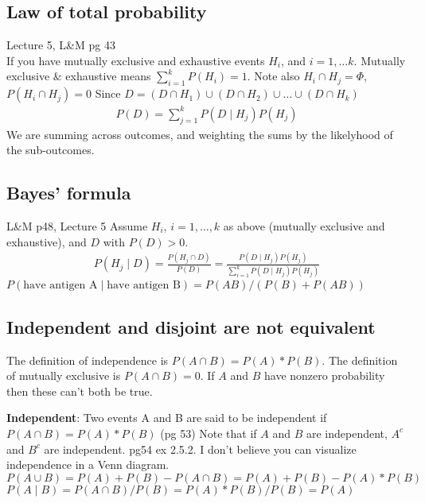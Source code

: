  \subsection{Law of total probability} {\tiny Lecture 5, L\&M pg 43}   \hfill \\
 If you have mutually exclusive and exhaustive events $H_i$, and $i = 1, \dots k$.  Mutually exclusive \& exhaustive means $\sum_{i=1}^k P(H_i) = 1$.  Note also $H_i \cap H_j = \Phi$, $P(H_i \cap H_j) = 0$  
 Since $D = (D \cap H_1) \cup (D \cap H_2) \cup \dots \cup  (D \cap H_k)$
	\begin{align*}
 		P(D) = \sum_{j=1}^k P(D \mid H_j) P(H_j) 
  	\end{align*}
We are summing across outcomes, and weighting the sums by the likelyhood of the sub-outcomes.
 
 \subsection{Bayes' formula} {\tiny L\&M p48, Lecture 5}
 Assume $H_i$, $i = 1, \dots, k$ as above (mutually exclusive and exhaustive), and $D$ with $P(D) > 0$.
 	\begin{align*}
		P(H_j \mid D) = \frac{P(H_j \cap D)}{P(D)} = \frac{P(D \mid H_j) P(H_j) }{\sum_{i=1}^k P(D \mid H_j) P(H_j) }
	\end{align*}
$P(\mbox{have antigen A} \mid \mbox{have antigen B}) = P(AB)/(P(B) + P(AB)) $
	

\subsection{Independent and disjoint are not equivalent}
The definition of independence is $P(A \cap B) = P(A)*P(B)$.  The definition of mutually exclusive is $P(A \cap B) = 0$.   If $A$ and $B$ have nonzero probability then these can't both be true.  

\textbf{Independent}: Two events A and B are said to be independent if $P(A \cap B) = P(A)*P(B)$ {\tiny (pg 53)} Note that if $A$ and $B$ are independent, $A^c$ and $B^c$ are independent. {\tiny pg54 ex 2.5.2.}  I don't believe you can visualize independence in a Venn diagram. \hfill \\ 
$P(A \cup B) = P(A) + P(B) - P(A \cap B) = P(A) + P(B) - P(A)*P(B)$ \hfill \\
$P(A \mid B) = P(A \cap B)/P(B) = P(A)*P(B)/P(B) = P(A)$ \hfill \\

